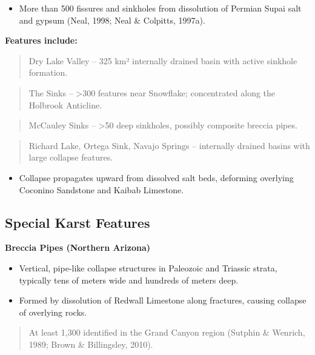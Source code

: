 \documentclass[
]{agujournal2019}
\providecommand{\tightlist}{%
  \setlength{\itemsep}{0pt}\setlength{\parskip}{0pt}}
\begin{document}
\begin{itemize}
\tightlist
\item
  More than 500 fissures and sinkholes from dissolution of Permian Supai
  salt and gypsum (Neal, 1998; Neal \& Colpitts, 1997a).
\end{itemize}

\textbf{Features include:}

\begin{quote}
Dry Lake Valley -- 325 km² internally drained basin with active sinkhole
formation.
\end{quote}

\begin{quote}
The Sinks -- \textgreater300 features near Snowflake; concentrated along
the Holbrook Anticline.
\end{quote}

\begin{quote}
McCauley Sinks -- \textgreater50 deep sinkholes, possibly composite
breccia pipes.
\end{quote}

\begin{quote}
Richard Lake, Ortega Sink, Navajo Springs -- internally drained basins
with large collapse features.
\end{quote}

\begin{itemize}
\tightlist
\item
  Collapse propagates upward from dissolved salt beds, deforming
  overlying Coconino Sandstone and Kaibab Limestone.
\end{itemize}

\subsection{Special Karst Features}\label{special-karst-features}

\textbf{Breccia Pipes (Northern Arizona)}

\begin{itemize}
\item
  Vertical, pipe-like collapse structures in Paleozoic and Triassic
  strata, typically tens of meters wide and hundreds of meters deep.
\item
  Formed by dissolution of Redwall Limestone along fractures, causing
  collapse of overlying rocks.
\end{itemize}

\begin{quote}
At least 1,300 identified in the Grand Canyon region (Sutphin \&
Wenrich, 1989; Brown \& Billingsley, 2010).
\end{quote}
\end{document}
